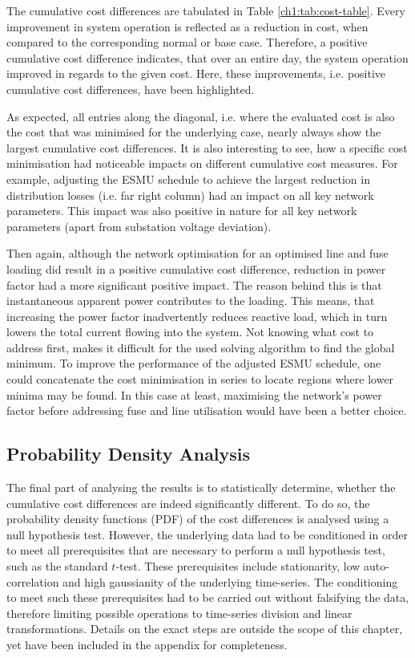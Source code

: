 

The cumulative cost differences are tabulated in Table \ref{ch1:tab:cost-table}.
Every improvement in system operation is reflected as a reduction in cost, when compared to the corresponding normal or base case.
Therefore, a positive cumulative cost difference indicates, that over an entire day, the system operation improved in regards to the given cost.
Here, these improvements, i.e. positive cumulative cost differences, have been highlighted.

As expected, all entries along the diagonal, i.e. where the evaluated cost is also the cost that was minimised for the underlying case, nearly always show the largest cumulative cost differences.
It is also interesting to see, how a specific cost minimisation had noticeable impacts on different cumulative cost measures.
For example, adjusting the ESMU schedule to achieve the largest reduction in distribution losses (i.e. far right column) had an impact on all key network parameters.
This impact was also positive in nature for all key network parameters (apart from substation voltage deviation).

Then again, although the network optimisation for an optimised line and fuse loading did result in a positive cumulative cost difference, reduction in power factor had a more significant positive impact.
The reason behind this is that instantaneous apparent power contributes to the loading.
This means, that increasing the power factor inadvertently reduces reactive load, which in turn lowers the total current flowing into the system.
Not knowing what cost to address first, makes it difficult for the used solving algorithm to find the global minimum.
To improve the performance of the adjusted ESMU schedule, one could concatenate the cost minimisation in series to locate regions where lower minima may be found.
In this case at least, maximising the network's power factor before addressing fuse and line utilisation would have been a better choice.

\subsection{Probability Density Analysis}
\label{ch1:subsec:probability-density-analysis}

The final part of analysing the results is to statistically determine, whether the cumulative cost differences are indeed significantly different.
To do so, the probability density functions (PDF) of the  cost differences is analysed using a null hypothesis test.
However, the underlying data had to be conditioned in order to meet all prerequisites that are necessary to perform a null hypothesis test, such as the standard $t$-test.
These prerequisites include stationarity, low auto-correlation and high gaussianity of the underlying time-series.
The conditioning to meet such these prerequisites had to be carried out without falsifying the data, therefore limiting possible operations to time-series division and linear transformations.
Details on the exact steps are outside the scope of this chapter, yet have been included in the appendix for completeness.

